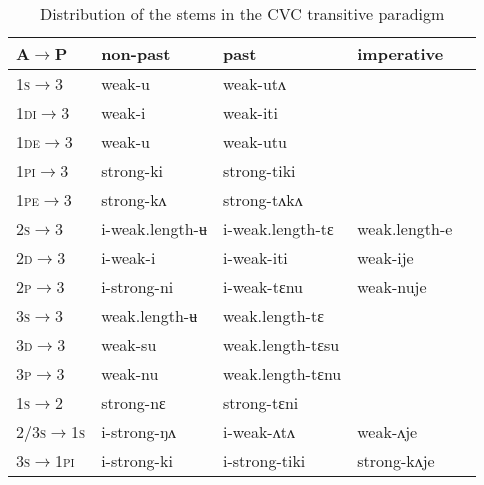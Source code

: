 \documentclass[oldfontcommands,oneside,a4paper,11pt]{article}
\newcommand{\ipa}[1]{{\phon \mbox{#1}}} %
\newcommand{\grise}[1]{\cellcolor{lightgray}\textbf{#1}}
\begin{document}
\begin{table}[H]
\caption{Distribution of the stems in the CVC transitive paradigm } \label{tab:trans.paradigm} \centering
\begin{tabular}{lllll}
\toprule
A$\rightarrow$P& non-past & past &imperative\\
\midrule
\textsc{1s}$\rightarrow$3 & weak-\ipa{u} & weak-\ipa{utʌ} \\
\textsc{1di}$\rightarrow$3 & weak-\ipa{i} & weak-\ipa{iti} \\
\textsc{1de}$\rightarrow$3 & weak-\ipa{u} & weak-\ipa{utu} \\
\textsc{1pi}$\rightarrow$3 & strong-\ipa{ki} & strong-\ipa{tiki} \\
\textsc{1pe}$\rightarrow$3 & strong-\ipa{kʌ} & strong-\ipa{tʌkʌ} \\
\textsc{2s}$\rightarrow$3 & \ipa{i}-weak.length-\ipa{ʉ} & \ipa{i}-weak.length-\ipa{tɛ} \grise{} &weak.length-\ipa{e}\\
\textsc{2d}$\rightarrow$3 & \ipa{i}-weak-\ipa{i} & \ipa{i}-weak-\ipa{iti} &weak-\ipa{ije}\\
\textsc{2p}$\rightarrow$3 & \ipa{i}-strong-\ipa{ni} & \ipa{i}-weak-\ipa{tɛnu}\grise{} &weak-\ipa{nuje}\grise{}\\
\textsc{3s}$\rightarrow$3 & weak.length-\ipa{ʉ} & weak.length-\ipa{tɛ} \grise{}\\
\textsc{3d}$\rightarrow$3 & weak-\ipa{su} & weak.length-\ipa{tɛsu} \grise{}  \\
\textsc{3p}$\rightarrow$3 & weak-\ipa{nu} & weak.length-\ipa{tɛnu}\grise{} \\
\midrule
\textsc{1s}$\rightarrow$2 & strong-\ipa{nɛ} & strong-\ipa{tɛni}\\
\textsc{2/3s$\rightarrow$1s} & \ipa{i}-strong-\ipa{ŋʌ} & \ipa{i}-weak-\ipa{ʌtʌ} & weak-\ipa{ʌje}\\
\textsc{3s$\rightarrow$1pi} & \ipa{i}-strong-\ipa{ki} & \ipa{i}-strong-\ipa{tiki} & strong-\ipa{kʌje}\\
\bottomrule
\end{tabular}
\end{table}
\end{document}

